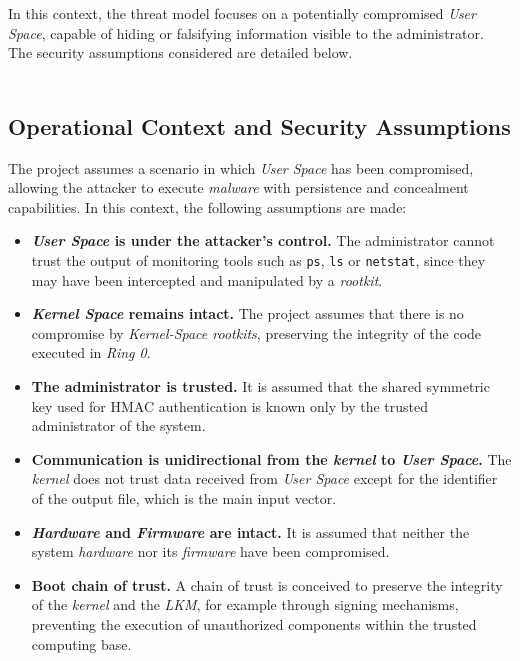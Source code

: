 In this context, the threat model focuses on a potentially compromised \textit{User Space}, capable of hiding or falsifying information visible to the administrator.
The security assumptions considered are detailed below.\\

\

\subsection{Operational Context and Security Assumptions}

The project assumes a scenario in which \textit{User Space} has been compromised, allowing the attacker to execute \textit{malware} with persistence and concealment capabilities.
In this context, the following assumptions are made:

\begin{itemize}
    \item \textbf{\textit{User Space} is under the attacker's control.} The administrator cannot trust the output of monitoring tools such as \texttt{ps}, \texttt{ls} or \texttt{netstat}, since they may have been intercepted and manipulated by a \textit{rootkit}.
    \item \textbf{\textit{Kernel Space} remains intact.} The project assumes that there is no compromise by \textit{Kernel-Space rootkits}, preserving the integrity of the code executed in \textit{Ring 0}.
    \item \textbf{The administrator is trusted.} It is assumed that the shared symmetric key used for HMAC authentication is known only by the trusted administrator of the system.
    \item \textbf{Communication is unidirectional from the \textit{kernel} to \textit{User Space}.} The \textit{kernel} does not trust data received from \textit{User Space} except for the identifier of the output file, which is the main input vector.
    \item \textbf{\textit{Hardware} and \textit{Firmware} are intact.} It is assumed that neither the system \textit{hardware} nor its \textit{firmware} have been compromised.
    \item \textbf{Boot chain of trust.} A chain of trust is conceived to preserve the integrity of the \textit{kernel} and the \textit{LKM}, for example through signing mechanisms, preventing the execution of unauthorized components within the trusted computing base.
\end{itemize}


